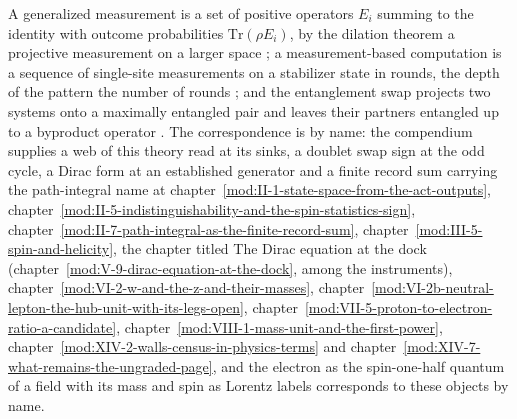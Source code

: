 \begin{chbridge}
A generalized measurement is a set of positive operators $E_i$ summing to the identity with outcome probabilities $\mathrm{Tr}(\rho E_i)$, by the dilation theorem a projective measurement on a larger space \cite{Peres1993}; a measurement-based computation is a sequence of single-site measurements on a stabilizer state in rounds, the depth of the pattern the number of rounds \cite{Raussendorf2001}; and the entanglement swap projects two systems onto a maximally entangled pair and leaves their partners entangled up to a byproduct operator \cite{Zukowski1993}. The correspondence is by name: the compendium supplies a web of this theory read at its sinks, a doublet swap sign at the odd cycle, a Dirac form at an established generator and a finite record sum carrying the path-integral name at chapter~\ref{mod:II-1-state-space-from-the-act-outputs}, chapter~\ref{mod:II-5-indistinguishability-and-the-spin-statistics-sign}, chapter~\ref{mod:II-7-path-integral-as-the-finite-record-sum}, chapter~\ref{mod:III-5-spin-and-helicity}, the chapter titled The Dirac equation at the dock (chapter~\ref{mod:V-9-dirac-equation-at-the-dock}, among the instruments), chapter~\ref{mod:VI-2-w-and-the-z-and-their-masses}, chapter~\ref{mod:VI-2b-neutral-lepton-the-hub-unit-with-its-legs-open}, chapter~\ref{mod:VII-5-proton-to-electron-ratio-a-candidate}, chapter~\ref{mod:VIII-1-mass-unit-and-the-first-power}, chapter~\ref{mod:XIV-2-walls-census-in-physics-terms} and chapter~\ref{mod:XIV-7-what-remains-the-ungraded-page}, and the electron as the spin-one-half quantum of a field with its mass and spin as Lorentz labels corresponds to these objects by name.
\end{chbridge}
